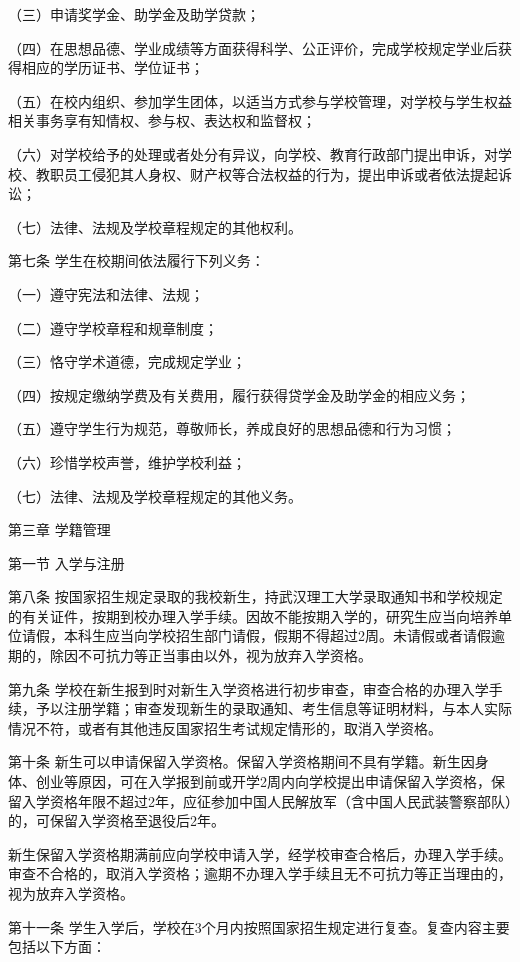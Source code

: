 \documentclass[UTF8,12pt,a4paper]{report}
\begin{document}
（三）申请奖学金、助学金及助学贷款；

（四）在思想品德、学业成绩等方面获得科学、公正评价，完成学校规定学业后获得相应的学历证书、学位证书；

（五）在校内组织、参加学生团体，以适当方式参与学校管理，对学校与学生权益相关事务享有知情权、参与权、表达权和监督权；

（六）对学校给予的处理或者处分有异议，向学校、教育行政部门提出申诉，对学校、教职员工侵犯其人身权、财产权等合法权益的行为，提出申诉或者依法提起诉讼；

（七）法律、法规及学校章程规定的其他权利。

第七条 学生在校期间依法履行下列义务：

（一）遵守宪法和法律、法规；

（二）遵守学校章程和规章制度；

（三）恪守学术道德，完成规定学业；

（四）按规定缴纳学费及有关费用，履行获得贷学金及助学金的相应义务；

（五）遵守学生行为规范，尊敬师长，养成良好的思想品德和行为习惯；

（六）珍惜学校声誉，维护学校利益；

（七）法律、法规及学校章程规定的其他义务。



第三章 学籍管理

第一节   入学与注册

第八条 按国家招生规定录取的我校新生，持武汉理工大学录取通知书和学校规定的有关证件，按期到校办理入学手续。因故不能按期入学的，研究生应当向培养单位请假，本科生应当向学校招生部门请假，假期不得超过2周。未请假或者请假逾期的，除因不可抗力等正当事由以外，视为放弃入学资格。

第九条 学校在新生报到时对新生入学资格进行初步审查，审查合格的办理入学手续，予以注册学籍；审查发现新生的录取通知、考生信息等证明材料，与本人实际情况不符，或者有其他违反国家招生考试规定情形的，取消入学资格。

第十条 新生可以申请保留入学资格。保留入学资格期间不具有学籍。新生因身体、创业等原因，可在入学报到前或开学2周内向学校提出申请保留入学资格，保留入学资格年限不超过2年，应征参加中国人民解放军（含中国人民武装警察部队）的，可保留入学资格至退役后2年。

新生保留入学资格期满前应向学校申请入学，经学校审查合格后，办理入学手续。审查不合格的，取消入学资格；逾期不办理入学手续且无不可抗力等正当理由的，视为放弃入学资格。

第十一条 学生入学后，学校在3个月内按照国家招生规定进行复查。复查内容主要包括以下方面：
\end{document}

